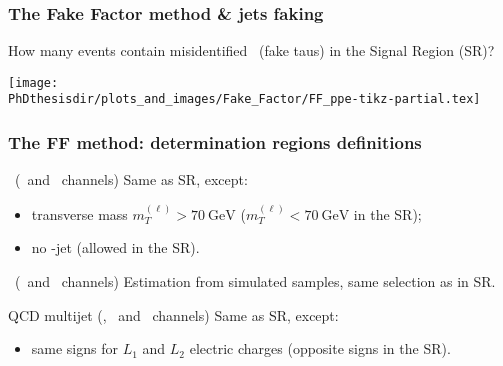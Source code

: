 \begin{frame}
\frametitle{The Fake Factor method \& jets faking \tauh}

\manip How many events contain misidentified \tauh\ (fake taus) in the Signal Region (SR)?

\pause

\begin{center}
\texttt{[image: \\PhDthesisdir/plots\_and\_images/Fake\_Factor/FF\_ppe-tikz-partial.tex]}
\end{center}
\end{frame}



\begin{frame}
\frametitle{The FF method: determination regions definitions}

\begin{block}{\Wjets\ (\mu\tauh\ and \ele\tauh\ channels)}
Same as SR, except:
\begin{itemize}
\item transverse mass $m_T^{(\ell)}>\SI{70}{\GeV}$ ($m_T^{(\ell)}<\SI{70}{\GeV}$ in the SR);
\item no \quarkb-jet (allowed in the SR).
\end{itemize}
\end{block}

\pause\vfill

\begin{block}{\ttbar\ (\mu\tauh\ and \ele\tauh\ channels)}
Estimation from simulated samples, same selection as in SR.
\end{block}

\pause\vfill

\begin{block}{QCD multijet (\tauh\tauh, \mu\tauh\ and \ele\tauh\ channels)}
Same as SR, except:
\begin{itemize}
\item same signs for $L_1$ and $L_2$ electric charges (opposite signs in the SR).
\end{itemize}
\end{block}

\vfill
\end{frame}

%
%

